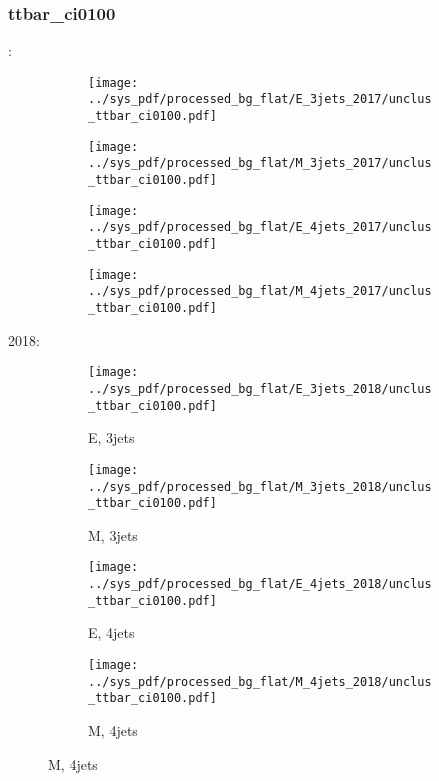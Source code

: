 \documentclass{beamer}
\begin{document}
\begin{frame}
\frametitle{ttbar_ci0100}
\fontsize{5}{1}:
\begin{figure}
\centering
\begin{subfigure}[b]{0.24\textwidth}
\texttt{[image: ../sys\_pdf/processed\_bg\_flat/E\_3jets\_2017/unclus\_ttbar\_ci0100.pdf]}
\end{subfigure}
\begin{subfigure}[b]{0.24\textwidth}
\texttt{[image: ../sys\_pdf/processed\_bg\_flat/M\_3jets\_2017/unclus\_ttbar\_ci0100.pdf]}
\end{subfigure}
\begin{subfigure}[b]{0.24\textwidth}
\texttt{[image: ../sys\_pdf/processed\_bg\_flat/E\_4jets\_2017/unclus\_ttbar\_ci0100.pdf]}
\end{subfigure}
\begin{subfigure}[b]{0.24\textwidth}
\texttt{[image: ../sys\_pdf/processed\_bg\_flat/M\_4jets\_2017/unclus\_ttbar\_ci0100.pdf]}
\end{subfigure}
\end{figure}
2018:
\begin{figure}
\centering
\begin{subfigure}[b]{0.24\textwidth}
\texttt{[image: ../sys\_pdf/processed\_bg\_flat/E\_3jets\_2018/unclus\_ttbar\_ci0100.pdf]}
\captionsetup{font=tiny}
\caption{E, 3jets}
\end{subfigure}
\begin{subfigure}[b]{0.24\textwidth}
\texttt{[image: ../sys\_pdf/processed\_bg\_flat/M\_3jets\_2018/unclus\_ttbar\_ci0100.pdf]}
\captionsetup{font=tiny}
\caption{M, 3jets}
\end{subfigure}
\begin{subfigure}[b]{0.24\textwidth}
\texttt{[image: ../sys\_pdf/processed\_bg\_flat/E\_4jets\_2018/unclus\_ttbar\_ci0100.pdf]}
\captionsetup{font=tiny}
\caption{E, 4jets}
\end{subfigure}
\begin{subfigure}[b]{0.24\textwidth}
\texttt{[image: ../sys\_pdf/processed\_bg\_flat/M\_4jets\_2018/unclus\_ttbar\_ci0100.pdf]}
\captionsetup{font=tiny}
\caption{M, 4jets}
\end{subfigure}
\end{figure}
\end{frame}
\end{document}
